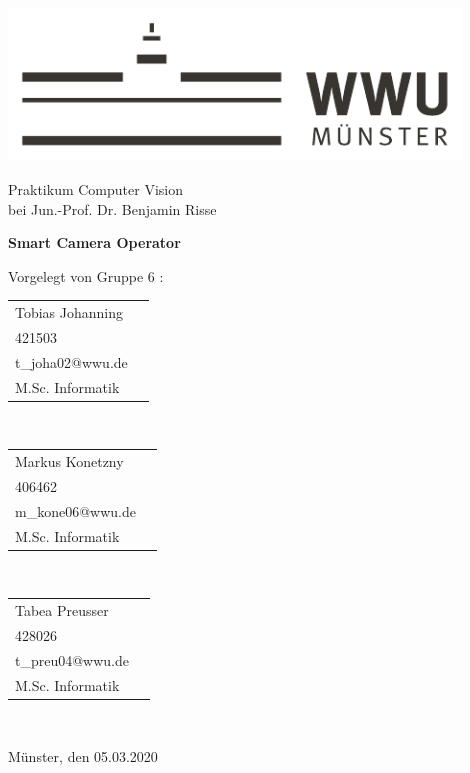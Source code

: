 
\begin{centering}
\vspace{4cm}
\includegraphics[width=12cm]{./img/wwu-logo-neu.pdf}

\vspace{2cm} 

{\large
	Praktikum Computer Vision\\[0.5cm]
	bei Jun.-Prof. Dr. Benjamin Risse\\[2cm]
}

{\LARGE
	\textbf{Smart Camera Operator}\\[2cm]
}


{\large
	Vorgelegt von Gruppe 6 :\\[1cm]
}



\begin{minipage}{\textwidth}
\begin{minipage}[c]{0.3\textwidth}
\centering
 \begin{tabular}{ll}
 		Tobias Johanning \\
    	{421503} \\
    	{t_joha02@wwu.de} \\
    	 M.Sc. Informatik\\
    \end{tabular}\\
\end{minipage}\hfill
\begin{minipage}[c]{0.3\textwidth}
\centering
   \begin{tabular}{ll}
 		Markus Konetzny \\
    	{406462} \\
    	{m_kone06@wwu.de} \\
    	M.Sc. Informatik\\
    \end{tabular}\\
\end{minipage}\hfill
\begin{minipage}[c]{0.3\textwidth}
\centering
   \begin{tabular}{ll}
 		Tabea Preusser \\
    	{428026} \\
    	{t_preu04@wwu.de} \\
    	M.Sc. Informatik\\
    \end{tabular}\\
\end{minipage}\hfill
\end{minipage}

\vspace{2 cm}
{\large
	Münster, den 05.03.2020\\[1cm]
}
\end{centering}

\vfill


 

